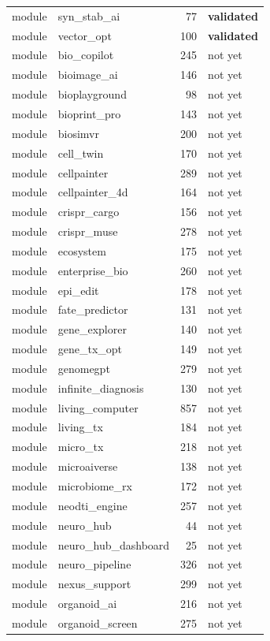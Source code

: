 \begin{center}
\begin{longtable}{llrl}
module & syn\_stab\_ai & 77 & \textbf{validated}\\
module & vector\_opt & 100 & \textbf{validated}\\
module & bio\_copilot & 245 & not yet\\
module & bioimage\_ai & 146 & not yet\\
module & bioplayground & 98 & not yet\\
module & bioprint\_pro & 143 & not yet\\
module & biosimvr & 200 & not yet\\
module & cell\_twin & 170 & not yet\\
module & cellpainter & 289 & not yet\\
module & cellpainter\_4d & 164 & not yet\\
module & crispr\_cargo & 156 & not yet\\
module & crispr\_muse & 278 & not yet\\
module & ecosystem & 175 & not yet\\
module & enterprise\_bio & 260 & not yet\\
module & epi\_edit & 178 & not yet\\
module & fate\_predictor & 131 & not yet\\
module & gene\_explorer & 140 & not yet\\
module & gene\_tx\_opt & 149 & not yet\\
module & genomegpt & 279 & not yet\\
module & infinite\_diagnosis & 130 & not yet\\
module & living\_computer & 857 & not yet\\
module & living\_tx & 184 & not yet\\
module & micro\_tx & 218 & not yet\\
module & microaiverse & 138 & not yet\\
module & microbiome\_rx & 172 & not yet\\
module & neodti\_engine & 257 & not yet\\
module & neuro\_hub & 44 & not yet\\
module & neuro\_hub\_dashboard & 25 & not yet\\
module & neuro\_pipeline & 326 & not yet\\
module & nexus\_support & 299 & not yet\\
module & organoid\_ai & 216 & not yet\\
module & organoid\_screen & 275 & not yet\\

\end{longtable}
\end{center}
